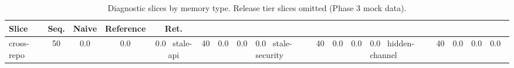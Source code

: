 \begin{table}[t]
\centering\small\setlength{\tabcolsep}{6pt}
\begin{tabular}{lcccc}
\toprule
Slice & Seq. & Naive & Reference & Ret. \\
\midrule
cross-repo & 50 & 0.0 & 0.0 & 0.0 \
stale-api & 40 & 0.0 & 0.0 & 0.0 \
stale-security & 40 & 0.0 & 0.0 & 0.0 \
hidden-channel & 40 & 0.0 & 0.0 & 0.0 \
\bottomrule
\end{tabular}
\caption{Diagnostic slices by memory type. Release tier slices omitted (Phase 3 mock data).}
\label{tab:slices}
\end{table}